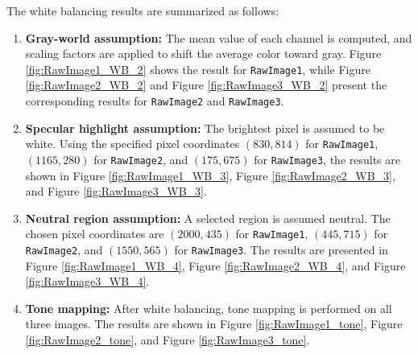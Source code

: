 \documentclass[11pt, a4]{article}
\begin{document}
\begin{enumerate}
		The white balancing results are summarized as follows:  
		\begin{enumerate}
			\item \textbf{Gray-world assumption:} The mean value of each channel is computed, and scaling factors are applied to shift the average color toward gray. Figure \ref{fig:RawImage1_WB_2} shows the result for \texttt{RawImage1}, while Figure \ref{fig:RawImage2_WB_2} and Figure \ref{fig:RawImage3_WB_2} present the corresponding results for \texttt{RawImage2} and \texttt{RawImage3}.
			\item \textbf{Specular highlight assumption:} The brightest pixel is assumed to be white. Using the specified pixel coordinates $(830, 814)$ for \texttt{RawImage1}, $(1165, 280)$ for \texttt{RawImage2}, and $(175, 675)$ for \texttt{RawImage3}, the results are shown in Figure \ref{fig:RawImage1_WB_3}, Figure \ref{fig:RawImage2_WB_3}, and Figure \ref{fig:RawImage3_WB_3}.
			\item \textbf{Neutral region assumption:} A selected region is assumed neutral. The chosen pixel coordinates are $(2000, 435)$ for \texttt{RawImage1}, $(445, 715)$ for \texttt{RawImage2}, and $(1550, 565)$ for \texttt{RawImage3}. The results are presented in Figure \ref{fig:RawImage1_WB_4}, Figure \ref{fig:RawImage2_WB_4}, and Figure \ref{fig:RawImage3_WB_4}.
			\item \textbf{Tone mapping:} After white balancing, tone mapping is performed on all three images. The results are shown in Figure \ref{fig:RawImage1_tone}, Figure \ref{fig:RawImage2_tone}, and Figure \ref{fig:RawImage3_tone}.
		\end{enumerate}
			\begin{figure}[h]
				\centering
\end{figure}
\end{enumerate}
\end{document}
